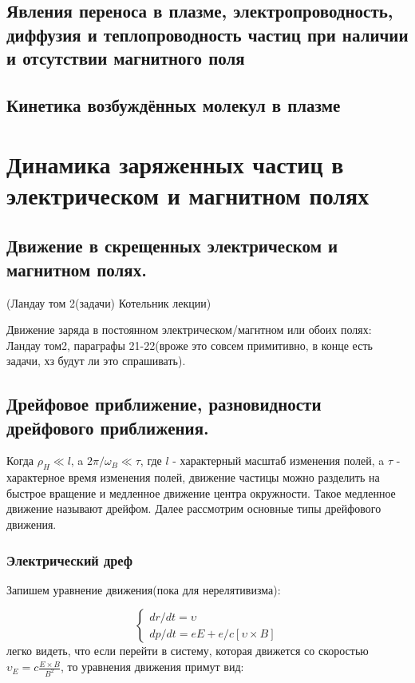 \documentclass[10pt, a4paper]{article}
\numberwithin{equation}{section}
\begin{document}
\subsection{Явления переноса в плазме, электропроводность, диффузия и теплопроводность частиц при наличии и отсутствии магнитного поля}

\subsection{Кинетика возбуждённых молекул в плазме}

\section{Динамика заряженных частиц в электрическом и магнитном полях}
\label{sec.4}

\subsection{Движение в скрещенных электрическом и магнитном полях.}
\label{sec.4.1}
(Ландау том 2(задачи) Котельник лекции)

Движение заряда в постоянном электрическом/магнтном или обоих полях: Ландау том2, параграфы 21-22(вроже это совсем 
примитивно, в конце есть задачи, хз будут ли это спрашивать).

\subsection{Дрейфовое приближение, разновидности дрейфового приближения.}
\label{sec.4.2}
Когда $\rho_H\ll l$, a $2\pi/\omega_B \ll \tau$, где $l$ - характерный масштаб изменения полей, a $\tau$ - характерное
время изменения полей, движение частицы можно разделить на быстрое вращение и медленное движение центра окружности.
Такое медленное движение называют дрейфом. Далее рассмотрим основные типы дрейфового движения.

\subsubsection{Электрический дреф}
\label{sec.4.2.1}
Запишем уравнение движения(пока для нерелятивизма):

\begin{equation}
    \begin{cases}
    \label{eq.4.2.1-motion}
        dr/dt = \upsilon \\
        dp/dt = e E + e/c [\upsilon \times B]
    \end{cases}
\end{equation}
легко видеть, что если перейти в систему, которая движется со скоростью $\upsilon_E = c\frac{E\times B}{B^2}$, то
уравнения движения примут вид:
\end{document}
